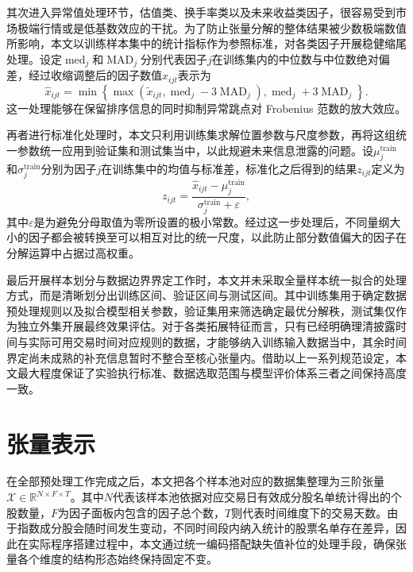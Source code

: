 其次进入异常值处理环节，估值类、换手率类以及未来收益类因子，很容易受到市场极端行情或是低基数效应的干扰。为了防止张量分解的整体结果被少数极端数值所影响，本文以训练样本集中的统计指标作为参照标准，对各类因子开展稳健缩尾处理。设定$\operatorname{med}_j$和$\operatorname{MAD}_j$分别代表因子$j$在训练集内的中位数与中位数绝对偏差，经过收缩调整后的因子数值$\hat{x}_{ijt}$表示为
\begin{equation}
\hat{x}_{ijt}
=\min\left\{\max\left(\tilde{x}_{ijt},\operatorname{med}_j-3\operatorname{MAD}_j\right),\operatorname{med}_j+3\operatorname{MAD}_j\right\}.
\end{equation}
这一处理能够在保留排序信息的同时抑制异常跳点对 Frobenius 范数的放大效应。

再者进行标准化处理时，本文只利用训练集求解位置参数与尺度参数，再将这组统一参数统一应用到验证集和测试集当中，以此规避未来信息泄露的问题。设$\mu_j^{\mathrm{train}}$和$\sigma_j^{\mathrm{train}}$分别为因子$j$在训练集中的均值与标准差，标准化之后得到的结果$z_{ijt}$定义为
\begin{equation}
z_{ijt}=\frac{\hat{x}_{ijt}-\mu_j^{\mathrm{train}}}{\sigma_j^{\mathrm{train}}+\varepsilon},
\end{equation}
其中$\varepsilon$是为避免分母取值为零所设置的极小常数。经过这一步处理后，不同量纲大小的因子都会被转换至可以相互对比的统一尺度，以此防止部分数值偏大的因子在分解运算中占据过高权重。

最后开展样本划分与数据边界界定工作时，本文并未采取全量样本统一拟合的处理方式，而是清晰划分出训练区间、验证区间与测试区间。其中训练集用于确定数据预处理规则以及拟合模型相关参数，验证集用来筛选确定最优分解秩，测试集仅作为独立外集开展最终效果评估。对于各类拓展特征而言，只有已经明确理清披露时间与实际可用交易时间对应规则的数据，才能够纳入训练输入数据当中，其余时间界定尚未成熟的补充信息暂时不整合至核心张量内。借助以上一系列规范设定，本文最大程度保证了实验执行标准、数据选取范围与模型评价体系三者之间保持高度一致。

\section{张量表示}

在全部预处理工作完成之后，本文把各个样本池对应的数据集整理为三阶张量$\mathcal{X}\in\mathbb{R}^{N\times F\times T}$。其中$N$代表该样本池依据对应交易日有效成分股名单统计得出的个股数量，$F$为因子面板内包含的因子总个数，$T$则代表时间维度下的交易天数。由于指数成分股会随时间发生变动，不同时间段内纳入统计的股票名单存在差异，因此在实际程序搭建过程中，本文通过统一编码搭配缺失值补位的处理手段，确保张量各个维度的结构形态始终保持固定不变。

